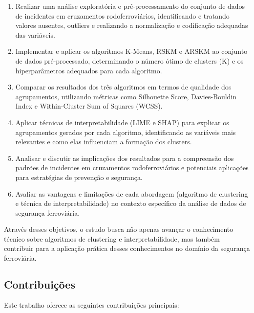 \documentclass[conference]{IEEEtran}
\begin{document}
\begin{enumerate}
    \item Realizar uma análise exploratória e pré-processamento do conjunto de dados de incidentes em cruzamentos rodoferroviários, identificando e tratando valores ausentes, outliers e realizando a normalização e codificação adequadas das variáveis.
    
    \item Implementar e aplicar os algoritmos K-Means, RSKM e ARSKM ao conjunto de dados pré-processado, determinando o número ótimo de clusters (K) e os hiperparâmetros adequados para cada algoritmo.
    
    \item Comparar os resultados dos três algoritmos em termos de qualidade dos agrupamentos, utilizando métricas como Silhouette Score, Davies-Bouldin Index e Within-Cluster Sum of Squares (WCSS).
    
    \item Aplicar técnicas de interpretabilidade (LIME e SHAP) para explicar os agrupamentos gerados por cada algoritmo, identificando as variáveis mais relevantes e como elas influenciam a formação dos clusters.
    
    \item Analisar e discutir as implicações dos resultados para a compreensão dos padrões de incidentes em cruzamentos rodoferroviários e potenciais aplicações para estratégias de prevenção e segurança.
    
    \item Avaliar as vantagens e limitações de cada abordagem (algoritmo de clustering e técnica de interpretabilidade) no contexto específico da análise de dados de segurança ferroviária.
\end{enumerate}

Através desses objetivos, o estudo busca não apenas avançar o conhecimento técnico sobre algoritmos de clustering e interpretabilidade, mas também contribuir para a aplicação prática desses conhecimentos no domínio da segurança ferroviária.

\subsection{Contribuições}
Este trabalho oferece as seguintes contribuições principais:
\end{document}
